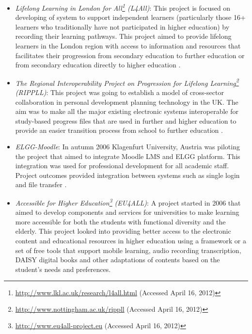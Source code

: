 \begin{itemize}
  \item \textit{Lifelong Learning in London for
  All\footnote{\url{http://www.lkl.ac.uk/research/l4all.html}  (Accessed April
  16, 2012)} (L4All)}: This project is focused on developing of \LLLs system to support independent
  learners (particularly those 16+ learners who traditionally have not
  participated in higher education) by recording their learning pathways. This
  project aimed to provide lifelong learners in the London region with access to
  information and resources that facilitates their progression from secondary
  education to further education or from secondary education directly to higher
  education \citep{Freitas2006}.

  \item \textit{The Regional Interoperability Project on Progression for
  Lifelong Learning\footnote{\url{http://www.nottingham.ac.uk/rippll} (Accessed
  April 16, 2012)} (RIPPLL)}: This project was going to establish a model of cross-sector
  collaboration in personal development planning technology in the UK. The aim
  was to make all the major existing electronic systems interoperable for
  study-based progress files that are used in further and higher education to
  provide an easier transition process from school to further education
  \citep{Hartnell-Young2006}.

  \item \textit{ELGG-Moodle}: In autumn 2006 Klagenfurt University, Austria was
  piloting the project that aimed to integrate Moodle LMS and ELGG platform. This
  integration was used for professional development for all academic staff.
  Project outcomes provided integration between systems such as single login and
  file transfer \citep{Attwell2007}.

  \item \textit{Accessible \LLLc for Higher
  Education\footnote{\url{http://www.eu4all-project.eu} (Accessed April 16,
  2012)} (EU4ALL)}: A project started in 2006 that aimed to develop components and services for universities to make learning more accessible for both the students with functional
  diversity and the elderly. This project looked into providing better access
  to the electronic content and educational resources in higher education using
  a framework or a set of free tools that support mobile learning, audio
  recording transcription, DAISY digital books and other adaptations of contents
  based on the student's needs and preferences.


\end{itemize}
